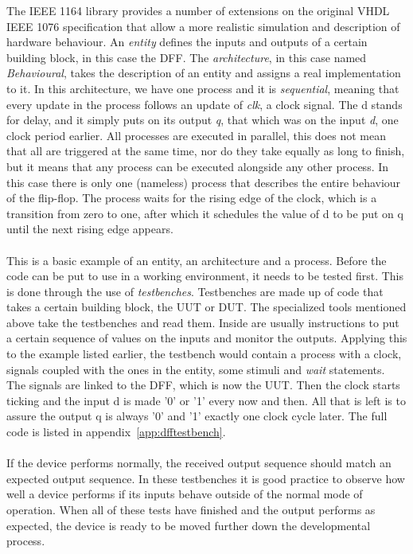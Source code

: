 \documentclass[11pt,british]{article}
\begin{document}
The \gls{IEEE} 1164 library provides a number of extensions on the original \gls{VHDL} IEEE 1076 specification that allow a more realistic simulation and description of hardware behaviour.\cite{IEEE1164} An \emph{entity} defines the inputs and outputs of a certain building block, in this case the \gls{DFF}. The \emph{architecture}, in this case named \emph{Behavioural}, takes the description of an entity and assigns a real implementation to it. In this architecture, we have one process and it is \emph{sequential}, meaning that every update in the process follows an update of \emph{clk}, a clock signal. The d stands for delay, and it simply puts on its output \emph{q}, that which was on the input \emph{d}, one clock period earlier. All processes are executed in parallel, this does not mean that all are triggered at the same time, nor do they take equally as long to finish, but it means that any process can be executed alongside any other process. In this case there is only one (nameless) process that describes the entire behaviour of the flip-flop. The process waits for the rising edge of the clock, which is a transition from zero to one, after which it schedules the value of d to be put on q until the next rising edge appears.
\\
\\
This is a basic example of an entity, an architecture and a process. Before the code can be put to use in a working environment, it needs to be tested first. This is done through the use of \emph{testbenches}.\cite{bergeron00} Testbenches are made up of code that takes a certain building block, the \gls{UUT} or \gls{DUT}. The specialized tools mentioned above take the testbenches and read them. Inside are usually instructions to put a certain sequence of values on the inputs and monitor the outputs.\cite{vhdltestbench} Applying this to the example listed earlier, the testbench would contain a process with a clock, signals coupled with the ones in the entity, some stimuli and \emph{wait} statements. The signals are linked to the DFF, which is now the UUT. Then the clock starts ticking and the input d is made '0' or '1' every now and then. All that is left is to assure the output q is always '0' and '1' exactly one clock cycle later. The full code is listed in appendix~\ref{app:dfftestbench}.
\\
\\
If the device performs normally, the received output sequence should match an expected output sequence. In these testbenches it is good practice to observe how well a device performs if its inputs behave outside of the normal mode of operation. When all of these tests have finished and the output performs as expected, the device is ready to be moved further down the developmental process.\cite{vhdldebug}
\end{document}
